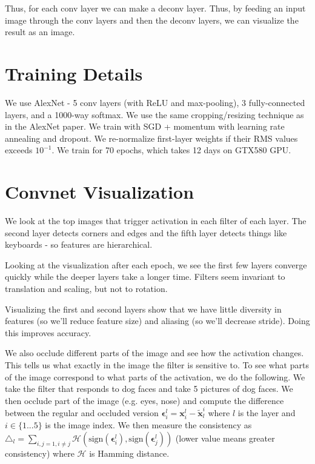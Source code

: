 \documentclass[a4paper]{article}
\begin{document}
Thus, for each conv layer we can make a deconv layer. Thus, by feeding
an input image through the conv layers and then the deconv layers, we can
visualize the result as an image.

\section{Training Details}
We use AlexNet - 5 conv layers (with ReLU and max-pooling), 3 fully-connected
layers, and a 1000-way softmax. We use the same cropping/resizing technique as
in the AlexNet paper. We train with SGD + momentum with learning rate annealing
and dropout. We re-normalize first-layer weights if their RMS values exceeds
$10^{-1}$. We train for 70 epochs, which takes 12 days on GTX580 GPU.

\section{Convnet Visualization}
We look at the top images that trigger activation in each filter of each layer.
The second layer detects corners and edges and the fifth layer detects things
like keyboards - so features are hierarchical.

Looking at the visualization after each epoch, we see the first few layers
converge quickly while the deeper layers take a longer time. Filters seem
invariant to translation and scaling, but not to rotation.

Visualizing the first and second layers show that we have little diversity
in features (so we'll reduce feature size) and aliasing (so we'll decrease
stride). Doing this improves accuracy.

We also occlude different parts of the image and see how the activation
changes. This tells us what exactly in the image the filter is sensitive to. To
see what parts of the image correspond to what parts of the activation,
we do the following. We take the filter that responds to dog faces and take
5 pictures of dog faces. We then occlude part of the image (e.g. eyes, nose)
and compute the difference between the regular
and occluded version $\bm{\epsilon}_i^{l} = \mathbf{x}_i^{l} -
\tilde{\mathbf{x}}_{l}^i$ where $l$ is the layer and $i \in \{1...5\}$ is the
image index. We then measure the consistency as $\triangle_l = \sum_{i, j = 1,
i \ne j}{\mathcal{H}(\text{sign}(\bm{\epsilon}_i^l), \text{sign}(
\bm{\epsilon}_j^l))}$ (lower value means greater consistency) where
$\mathcal{H}$ is Hamming distance.
\end{document}
